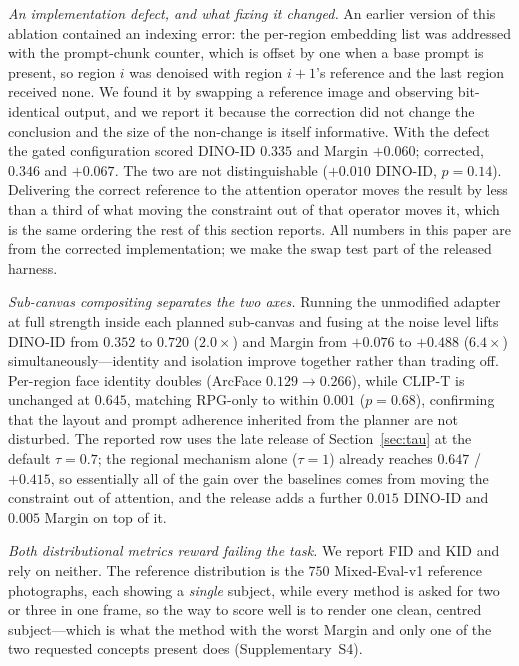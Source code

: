 \documentclass[review,10pt,times]{elsarticle}
\begin{document}
\noindent\textit{An implementation defect, and what fixing it changed.}
An earlier version of this ablation contained an indexing error: the
per-region embedding list was addressed with the prompt-chunk counter, which
is offset by one when a base prompt is present, so region $i$ was denoised
with region $i{+}1$'s reference and the last region received none.  We found
it by swapping a reference image and observing bit-identical output, and we
report it because the correction did not change the conclusion and the size
of the non-change is itself informative.  With the defect the gated
configuration scored DINO-ID $0.335$ and Margin $+0.060$; corrected, $0.346$
and $+0.067$.  The two are not distinguishable ($+0.010$ DINO-ID,
$p{=}0.14$).  Delivering the correct reference to the attention operator
moves the result by less than a third of what moving the constraint out of
that operator moves it, which is the same ordering the rest of this section
reports.  All numbers in this paper are from the corrected implementation;
we make the swap test part of the released harness.

\noindent\textit{Sub-canvas compositing separates the two axes.}
Running the unmodified adapter at full strength inside each planned
sub-canvas and fusing at the noise level lifts DINO-ID from $0.352$ to
$\mathbf{0.720}$ ($2.0\times$) and Margin from $+0.076$ to
$\mathbf{+0.488}$ ($6.4\times$) simultaneously---identity and isolation
improve together rather than trading off.  Per-region face identity
doubles (ArcFace $0.129\!\to\!0.266$), while CLIP-T is unchanged at
$0.645$, matching RPG-only to within $0.001$ ($p{=}0.68$), confirming that
the layout and prompt adherence inherited from the planner are not
disturbed.  The reported row uses the late release of
Section~\ref{sec:tau} at the default $\tau{=}0.7$; the regional
mechanism alone ($\tau{=}1$) already reaches $0.647$ / $+0.415$, so
essentially all of the gain over the baselines comes from moving the
constraint out of attention, and the release adds a further $0.015$
DINO-ID and $0.005$ Margin on top of it.

\noindent\textit{Both distributional metrics reward failing the
task.}
We report FID and KID and rely on neither.  The reference distribution is the
$750$ Mixed-Eval-v1 reference photographs, each showing a \emph{single}
subject, while every method is asked for two or three in one frame, so the way
to score well is to render one clean, centred subject---which is what the
method with the worst Margin and only one of the two requested concepts
present does (Supplementary~S4).
\end{document}
